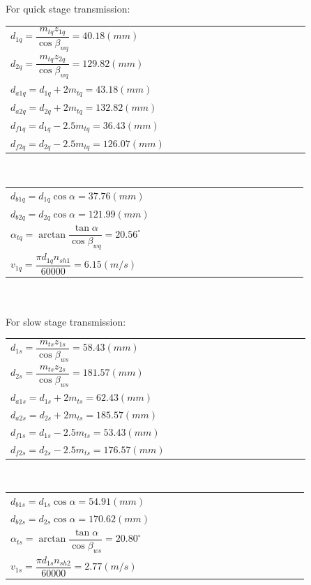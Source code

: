 For quick stage transmission:\\
\begin{tabular}[t]{p{0.5\linewidth}}
	$ d_{1q} = \dfrac{m_{tq}z_{1q}}{\cos\beta_{wq}} = 40.18\unit{(mm)} $\\
	$ d_{2q} = \dfrac{m_{tq}z_{2q}}{\cos\beta_{wq}} = 129.82\unit{(mm)} $\\
	$ d_{a1q} = d_{1q} + 2m_{tq} = 43.18\unit{(mm)}$\\
	$ d_{a2q} = d_{2q} + 2m_{tq} = 132.82\unit{(mm)}$\\
	$ d_{f1q} = d_{1q} - 2.5m_{tq} = 36.43\unit{(mm)}$\\
	$ d_{f2q} = d_{2q} - 2.5m_{tq} = 126.07\unit{(mm)}$\\
\end{tabular}~
\begin{tabular}[t]{p{0.5\linewidth}}
	$ d_{b1q} = d_{1q}\cos\alpha = 37.76\unit{(mm)}$\\
	$ d_{b2q} = d_{2q}\cos\alpha = 121.99 \unit{(mm)}$\\
	$ \alpha_{tq} = \arctan\dfrac{\tan\alpha}{\cos\beta_{wq}} = 20.56^\circ $\\
	$ v_{1q} = \dfrac{\pi d_{1q}n_{sh1}}{60000} = 6.15\unit{(m/s)}$
\end{tabular}\\\\
For slow stage transmission:\\
\begin{tabular}[t]{p{0.5\linewidth}}
	$ d_{1s} = \dfrac{m_{ts}z_{1s}}{\cos\beta_{ws}} = 58.43\unit{(mm)} $\\
	$ d_{2s} = \dfrac{m_{ts}z_{2s}}{\cos\beta_{ws}} = 181.57\unit{(mm)} $\\
	$ d_{a1s} = d_{1s} + 2m_{ts} = 62.43\unit{(mm)}$\\
	$ d_{a2s} = d_{2s} + 2m_{ts} = 185.57\unit{(mm)}$\\
	$ d_{f1s} = d_{1s} - 2.5m_{ts} = 53.43\unit{(mm)}$\\
	$ d_{f2s} = d_{2s} - 2.5m_{ts} = 176.57\unit{(mm)}$\\
\end{tabular}~
\begin{tabular}[t]{p{0.5\linewidth}}
	$ d_{b1s} = d_{1s}\cos\alpha = 54.91\unit{(mm)}$\\
	$ d_{b2s} = d_{2s}\cos\alpha = 170.62 \unit{(mm)}$\\
	$ \alpha_{ts} = \arctan\dfrac{\tan\alpha}{\cos\beta_{ws}} = 20.80^\circ $\\
	$ v_{1s} = \dfrac{\pi d_{1s}n_{sh2}}{60000} = 2.77\unit{(m/s)}$
\end{tabular}

